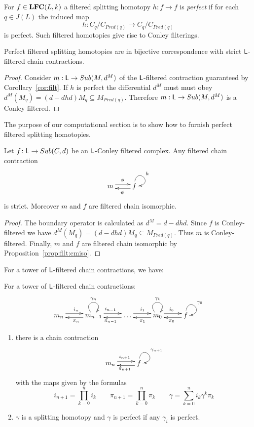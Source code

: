 For $f\in {\bf LFC}(L,k)$ a filtered splitting homotopy $h:f\to f$ is {\em perfect} if for each $q\in J(L)$ the induced map $$h:C_q/C_{Pred(q)}\to C_q/C_{Pred(q)}$$ is perfect.  Such filtered homotopies give rise to Conley filterings.

\begin{cor}
Perfect filtered splitting homotopies are in bijective correspondence with strict ${\mathsf L}$-filtered chain contractions.
\end{cor}
\begin{proof}
 Consider $m:{\mathsf L}\to Sub(M,d^M)$ of the ${\mathsf L}$-filtered contraction guaranteed by Corollary~\ref{cor:filt}.  If $h$ is perfect the differential $d^M$ must must obey $d^M(M_q) = (d-dhd)M_q\subseteq M_{Pred(q)}$.  Therefore $m:{\mathsf L}\to Sub(M,d^M)$ is a Conley filtered.
\end{proof}

The purpose of our computational section is to show how to furnish perfect filtered splitting homotopies.  


\begin{prop}
Let $f\colon{\mathsf L}\to Sub(C,d)$ be an ${\mathsf L}$-Conley filtered complex.  Any filtered chain contraction
\[
\xymatrixrowsep{0.03in}
\xymatrixcolsep{0.3in}
\xymatrix{
m  \ar[r]<3pt>^{\phi} & \ar[l]<3pt>^{\psi} f \ar@(u,r)^{h}
}
\]
is strict.  Moreover $m$ and $f$ are filtered chain isomorphic.
\end{prop}
\begin{proof}
 The boundary operator is calculated as $d^M= d-dhd$.  Since $f$ is Conley-filtered  we have $d^M(M_q) = (d-dhd)M_q\subseteq M_{Pred(q)}$.  Thus $m$ is Conley-filtered.  Finally, $m$ and $f$ are filtered chain isomorphic by Proposition~\ref{prop:filt:cmiso}.
\end{proof}

For a tower of ${\mathsf L}$-filtered chain contractions, we have:

\begin{prop}
For a tower of ${\mathsf L}$-filtered chain contractions:
\[
\xymatrixrowsep{0.03in}
\xymatrixcolsep{0.35in}
\xymatrix{
m_n \ar[r]<3pt>^{i_n} & \ar[l]<3pt>^{\pi_n } m_{n-1} \ar@(ul,ur)^{\gamma_n} \ar[r]<3pt>^{i_{n-1}} & \ar[l]<3pt>^{\pi_{n-1}}  \ldots \ar[r]<3pt>^{i_1}  & \ar[l]<3pt>^{\pi_1 } m_0 \ar@(ul,ur)^{\gamma_1}  \ar[r]<3pt>^{i_0} & \ar[l]<3pt>^{\pi_0} f \ar@(u,r)^{\gamma_0}
}
\]

\begin{enumerate}
\item there is a chain contraction 
\begin{align}\label{dia:cont:tower}
\xymatrixrowsep{0.03in}
\xymatrixcolsep{0.35in}
\xymatrix{
m_n \ar[r]<3pt>^{i_{n+1}} & \ar[l]<3pt>^{\pi_{n+1}} f \ar@(u,r)^{\gamma_{n+1} }
}
\end{align}
with the maps given by the formulas
\[
i_{n+1} = \prod_{k=0}^n i_k \quad\quad \pi_{n+1} = \prod_{k=0}^n \pi_k \quad\quad \gamma = \sum_{k=0}^n i_k \gamma^k \pi_k
\]
\item $\gamma$ is a splitting homotopy and $\gamma$ is perfect if any $\gamma_i$ is perfect.

\end{enumerate}
\end{prop}


